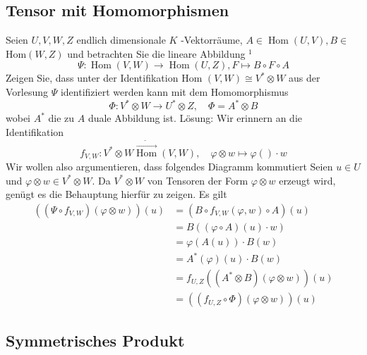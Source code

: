 \subsection{Tensor mit Homomorphismen}


Seien $U, V, W, Z$ endlich dimensionale $K$ -Vektorräume, $A \in \operatorname{Hom}(U, V), B \in$ $\mathrm{Hom}(W, Z)$ und betrachten Sie die lineare Abbildung $^{1}$
$$
\Psi: \operatorname{Hom}(V, W) \rightarrow \operatorname{Hom}(U, Z), F \mapsto B \circ F \circ A
$$
Zeigen Sie, dass unter der Identifikation Hom $(V, W) \cong V^{*} \otimes W$ aus der Vorlesung $\Psi$ identifiziert werden kann mit dem Homomorphismus
$$
\Phi: V^{*} \otimes W \rightarrow U^{*} \otimes Z, \quad \Phi=A^{*} \otimes B
$$
wobei $A^{*}$ die zu $A$ duale Abbildung ist.
Lösung:
Wir erinnern an die Identifikation
$$
f_{V, W}: V^{*} \otimes W \stackrel{\tilde{\rightarrow}}{\operatorname{Hom}}(V, W), \quad \varphi \otimes w \mapsto \varphi() \cdot w
$$
Wir wollen also argumentieren, dass folgendes Diagramm kommutiert
Seien $u \in U$ und $\varphi \otimes w \in V^{*} \otimes W .$ Da $V^{*} \otimes W$ von Tensoren der Form $\varphi \otimes w$ erzeugt wird, genügt es die Behauptung hierfür zu zeigen. Es gilt
$$
\begin{aligned}
\left(\left(\Psi \circ f_{V, W}\right)(\varphi \otimes w)\right)(u) &=\left(B \circ f_{V, W}(\varphi, w) \circ A\right)(u) \\
&=B((\varphi \circ A)(u) \cdot w) \\
&=\varphi(A(u)) \cdot B(w) \\
&=A^{*}(\varphi)(u) \cdot B(w) \\
&=f_{U, Z}\left(\left(A^{*} \otimes B\right)(\varphi \otimes w)\right)(u) \\
&=\left(\left(f_{U, Z} \circ \Phi\right)(\varphi \otimes w)\right)(u)
\end{aligned}
$$

\subsection{Symmetrisches Produkt}

